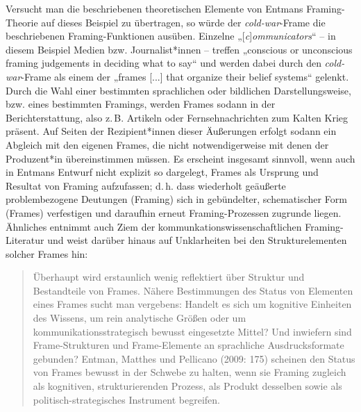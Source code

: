 Versucht man die beschriebenen theoretischen Elemente von Entmans Fra\-ming-Theorie auf dieses Beispiel zu übertragen, so würde der \emph{cold-war}-Frame die beschriebenen Framing-Funktionen ausüben. Einzelne „{[}\emph{c}{]}\emph{ommunicators}`` -- in diesem Beispiel Medien bzw. Journalist*innen -- treffen „conscious or unconscious framing judgements in deciding what to say`` \autocite[52]{entmanFramingClarificationFractured1993} und werden dabei durch den \emph{cold-war}-Frame als einem der „frames {[}...{]} that organize their belief systems`` gelenkt. Durch die Wahl einer bestimmten sprachlichen oder bildlichen Darstellungsweise, bzw. eines bestimmten Framings, werden Frames sodann in der Berichterstattung, also z.\,B. Artikeln oder Fernsehnachrichten zum Kalten Krieg präsent. Auf Seiten der Rezipient*innen dieser Äußerungen erfolgt sodann ein Abgleich mit den eigenen Frames, die nicht notwendigerweise mit denen der Produzent*in übereinstimmen müssen. Es erscheint insgesamt sinnvoll, wenn auch in Entmans Entwurf nicht explizit so dargelegt, Frames als Ursprung und Resultat von Framing aufzufassen; d.\,h. dass wiederholt geäußerte problembezogene Deutungen (Framing) sich in gebündelter, schematischer Form (Frames) verfestigen und daraufhin erneut Framing-Prozessen zugrunde liegen. Ähnliches entnimmt auch Ziem der kommunkationswissenschaftlichen Framing-Literatur und weist darüber hinaus auf Unklarheiten bei den Strukturelementen solcher Frames hin:

\begin{quote}
Überhaupt wird erstaunlich wenig reflektiert über Struktur und Bestandteile von Frames. Nähere Bestimmungen des Status von Elementen eines Frames sucht man vergebens: Handelt es sich um kognitive Einheiten des Wissens, um rein analytische Größen oder um kommunikationsstrategisch bewusst eingesetzte Mittel? Und inwiefern sind Frame-Strukturen und Frame-Elemente an sprachliche Ausdrucksformate gebunden? Entman, Matthes und Pellicano (2009: 175) scheinen den Status von Frames bewusst in der Schwebe zu halten, wenn sie Framing zugleich als kognitiven, strukturierenden Prozess, als Produkt desselben sowie als politisch-strategisches Instrument begreifen. \autocite[149]{ziemFramesAlsPraedikations2014}
\end{quote}

